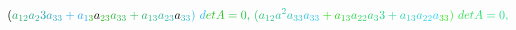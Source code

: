 \documentclass[12pt]{article}
\begin{document}
\begin{displaymath}
{(} \mathcolor[RGB]{30,165,90}{a} _ { \mathcolor[RGB]{30,165,105}{1} \mathcolor[RGB]{30,165,120}{2} } \mathcolor[RGB]{30,165,135}{a} _ { \mathcolor[RGB]{30,165,150}{2} } \mathcolor[RGB]{30,165,165}{3} \mathcolor[RGB]{30,165,180}{a} _ { \mathcolor[RGB]{30,165,195}{3} \mathcolor[RGB]{30,165,210}{3} } \mathcolor[RGB]{30,165,225}{+} \mathcolor[RGB]{30,165,240}{a} _ { \mathcolor[RGB]{30,165,255}{1} \mathcolor[RGB]{30,180,0}{3} }
a _ { \mathcolor[RGB]{30,180,15}{2} \mathcolor[RGB]{30,180,30}{3} } \mathcolor[RGB]{30,180,45}{a} _ { \mathcolor[RGB]{30,180,60}{3} \mathcolor[RGB]{30,180,75}{3} } \mathcolor[RGB]{30,180,90}{+} \mathcolor[RGB]{30,180,105}{a} _ { \mathcolor[RGB]{30,180,120}{1} \mathcolor[RGB]{30,180,135}{3} } \mathcolor[RGB]{30,180,150}{a} _ { \mathcolor[RGB]{30,180,165}{2} \mathcolor[RGB]{30,180,180}{3} }
a _ { \mathcolor[RGB]{30,180,195}{3} \mathcolor[RGB]{30,180,210}{3} } \mathcolor[RGB]{30,180,225}{)} \mathcolor[RGB]{30,180,240}{\operatorname*} { \mathcolor[RGB]{30,180,255}{d} \mathcolor[RGB]{30,195,0}{e} \mathcolor[RGB]{30,195,15}{t} } \mathcolor[RGB]{30,195,30}{A} \mathcolor[RGB]{30,195,45}{=} \mathcolor[RGB]{30,195,60}{0} \mathcolor[RGB]{30,195,75}{,} \mathcolor[RGB]{30,195,90}{\,
(} \mathcolor[RGB]{30,195,105}{a} _ { \mathcolor[RGB]{30,195,120}{1} \mathcolor[RGB]{30,195,135}{2} } \mathcolor[RGB]{30,195,150}{a} ^ { \mathcolor[RGB]{30,195,165}{2} } \mathcolor[RGB]{30,195,180}{a} _ { \mathcolor[RGB]{30,195,195}{3} \mathcolor[RGB]{30,195,210}{3} } \mathcolor[RGB]{30,195,225}{a} _ { \mathcolor[RGB]{30,195,240}{3} \mathcolor[RGB]{30,195,255}{3} } \mathcolor[RGB]{30,210,0}{+} \mathcolor[RGB]{30,210,15}{a} _ { \mathcolor[RGB]{30,210,30}{1} \mathcolor[RGB]{30,210,45}{3} } \mathcolor[RGB]{30,210,60}{a} _ { \mathcolor[RGB]{30,210,75}{2} \mathcolor[RGB]{30,210,90}{2} } \mathcolor[RGB]{30,210,105}{a} _ { \mathcolor[RGB]{30,210,120}{3} } \mathcolor[RGB]{30,210,135}{3} \mathcolor[RGB]{30,210,150}{+} \mathcolor[RGB]{30,210,165}{a} _ { \mathcolor[RGB]{30,210,180}{1} \mathcolor[RGB]{30,210,195}{3} } \mathcolor[RGB]{30,210,210}{a} _ { \mathcolor[RGB]{30,210,225}{2} \mathcolor[RGB]{30,210,240}{2} } \mathcolor[RGB]{30,210,255}{a} _ { \mathcolor[RGB]{30,225,0}{3} \mathcolor[RGB]{30,225,15}{3} } \mathcolor[RGB]{30,225,30}{)} \mathcolor[RGB]{30,225,45}{\operatorname*} { \mathcolor[RGB]{30,225,60}{d} \mathcolor[RGB]{30,225,75}{e} \mathcolor[RGB]{30,225,90}{t} } \mathcolor[RGB]{30,225,105}{A} \mathcolor[RGB]{30,225,120}{=} \mathcolor[RGB]{30,225,135}{0} \mathcolor[RGB]{30,225,150}{,}
\end{displaymath}
\end{document}
